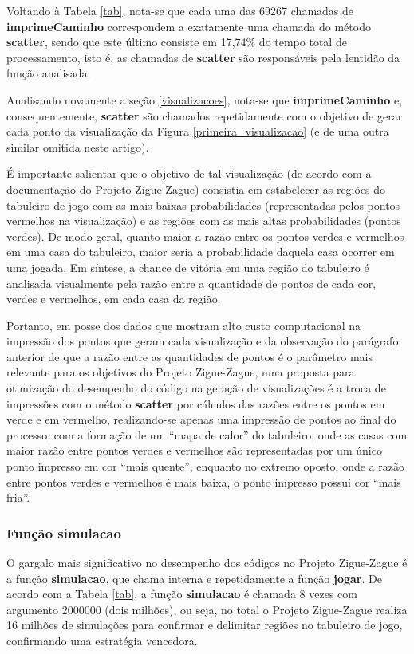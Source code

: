 \documentclass[12pt]{article}
\newcommand{\aspas}[1]{``#1''} %
\begin{document}
Voltando à Tabela \ref{tab}, nota-se que cada uma das 69267 chamadas de \textbf{imprimeCaminho} correspondem a exatamente uma chamada do método \textbf{scatter}, sendo que este último consiste em 17,74\% do tempo total de processamento, isto é, as chamadas de \textbf{scatter} são responsáveis pela lentidão da função analisada.

Analisando novamente a seção \ref{visualizacoes}, nota-se que \textbf{imprimeCaminho} e, consequentemente, \textbf{scatter} são chamados repetidamente com o objetivo de gerar cada ponto da visualização da Figura \ref{primeira_visualizacao} (e de uma outra similar omitida neste artigo). 

É importante salientar que o objetivo de tal visualização (de acordo com a documentação do Projeto Zigue-Zague) consistia em estabelecer as regiões do tabuleiro de jogo com as mais baixas probabilidades (representadas pelos pontos vermelhos na visualização) e as regiões com as mais altas probabilidades (pontos verdes). De modo geral, quanto maior a razão entre os pontos verdes e vermelhos em uma casa do tabuleiro, maior seria a probabilidade daquela casa ocorrer em uma jogada. Em síntese, a chance de vitória em uma região do tabuleiro é analisada visualmente pela razão entre a quantidade de pontos de cada cor, verdes e vermelhos, em cada casa da região.

Portanto, em posse dos dados que mostram alto custo computacional na impressão dos pontos que geram cada visualização e da observação do parágrafo anterior de que a razão entre as quantidades de pontos é o parâmetro mais relevante para os objetivos do Projeto Zigue-Zague, uma proposta para otimização do desempenho do código na geração de visualizações é a troca de impressões com o método \textbf{scatter} por cálculos das razões entre os pontos em verde e em vermelho, realizando-se apenas uma impressão de pontos ao final do processo, com a formação de um \aspas{mapa de calor} do tabuleiro, onde as casas com maior razão entre pontos verdes e vermelhos são representadas por um único ponto impresso em cor \aspas{mais quente}, enquanto no extremo oposto, onde a razão entre pontos verdes e vermelhos é mais baixa, o ponto impresso possui cor \aspas{mais fria}.

\subsubsection{Função simulacao}
\label{simulacao}

O gargalo mais significativo no desempenho dos códigos no Projeto Zigue-Zague é a função \textbf{simulacao}, que chama interna e repetidamente a função \textbf{jogar}. De acordo com a Tabela \ref{tab}, a função \textbf{simulacao} é chamada 8 vezes com argumento 2000000 (dois milhões), ou seja, no total o Projeto Zigue-Zague realiza 16 milhões de simulações para confirmar e delimitar regiões no tabuleiro de jogo, confirmando uma estratégia vencedora.
\end{document}
